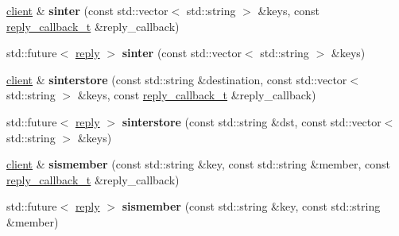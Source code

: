 \begin{DoxyCompactItemize}
\mbox{\label{classcpp__redis_1_1client_a67a96ae85449a4dfa6e8976666562be1}} 
\mbox{\hyperlink{classcpp__redis_1_1client}{client}} \& {\bfseries sinter} (const std\+::vector$<$ std\+::string $>$ \&keys, const \mbox{\hyperlink{classcpp__redis_1_1client_af7a65eb21aa25230bfbb0b0203c4fc04}{reply\+\_\+callback\+\_\+t}} \&reply\+\_\+callback)
\item 
\mbox{\label{classcpp__redis_1_1client_a069df07b6b3f18f5b2c215c67161c115}} 
std\+::future$<$ \mbox{\hyperlink{classcpp__redis_1_1reply}{reply}} $>$ {\bfseries sinter} (const std\+::vector$<$ std\+::string $>$ \&keys)
\item 
\mbox{\label{classcpp__redis_1_1client_a55f1722f17eaaa255196851efb0bdb93}} 
\mbox{\hyperlink{classcpp__redis_1_1client}{client}} \& {\bfseries sinterstore} (const std\+::string \&destination, const std\+::vector$<$ std\+::string $>$ \&keys, const \mbox{\hyperlink{classcpp__redis_1_1client_af7a65eb21aa25230bfbb0b0203c4fc04}{reply\+\_\+callback\+\_\+t}} \&reply\+\_\+callback)
\item 
\mbox{\label{classcpp__redis_1_1client_aa105a26578624af221f16675c0fbfc55}} 
std\+::future$<$ \mbox{\hyperlink{classcpp__redis_1_1reply}{reply}} $>$ {\bfseries sinterstore} (const std\+::string \&dst, const std\+::vector$<$ std\+::string $>$ \&keys)
\item 
\mbox{\label{classcpp__redis_1_1client_a369fb068437dfb3f63091d031174cc19}} 
\mbox{\hyperlink{classcpp__redis_1_1client}{client}} \& {\bfseries sismember} (const std\+::string \&key, const std\+::string \&member, const \mbox{\hyperlink{classcpp__redis_1_1client_af7a65eb21aa25230bfbb0b0203c4fc04}{reply\+\_\+callback\+\_\+t}} \&reply\+\_\+callback)
\item 
\mbox{\label{classcpp__redis_1_1client_af4ba6bfa37b81759324c726ef77acdbc}} 
std\+::future$<$ \mbox{\hyperlink{classcpp__redis_1_1reply}{reply}} $>$ {\bfseries sismember} (const std\+::string \&key, const std\+::string \&member)
\item 
\mbox{\label{classcpp__redis_1_1client_a5a8ff87da211196ca80a7c4badb0c378}} 

\end{DoxyCompactItemize}
